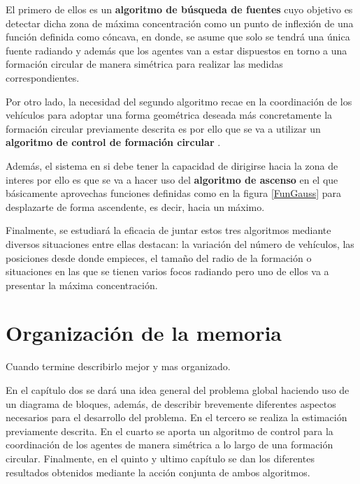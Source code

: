 El primero de ellos es un \textbf{algoritmo de búsqueda de fuentes} \cite{Estimacion_Gradiente} cuyo objetivo es detectar dicha zona de máxima concentración como un punto de inflexión de una función definida como cóncava, en donde, se asume que solo se tendrá una única fuente radiando y además que los agentes van a estar dispuestos en torno a una formación circular de manera simétrica para realizar las medidas correspondientes. 

Por otro lado, la necesidad del segundo algoritmo recae en la coordinación de los vehículos para adoptar una forma geométrica deseada más concretamente la formación circular previamente descrita es por ello que se va a utilizar un \textbf{algoritmo de control de formación circular} \cite{Control_Formacion}.

Además, el sistema en si debe tener la capacidad de dirigirse hacia la zona de interes por ello es que se va a hacer uso del \textbf{algoritmo de ascenso} en el que básicamente aprovechas funciones definidas como en la figura \ref{FunGauss} para desplazarte de forma ascendente, es decir, hacia un máximo.

Finalmente, se estudiará la eficacia de juntar estos tres algoritmos mediante diversos situaciones entre ellas destacan: la variación del número de vehículos, las posiciones desde donde empieces, el tamaño del radio de la formación o situaciones en las que se tienen varios focos radiando pero uno de ellos va a presentar la máxima concentración.

\section{Organización de la memoria}

Cuando termine describirlo mejor y mas organizado.

En el capítulo dos se dará una idea general del problema global haciendo uso de un diagrama de bloques, además, de describir brevemente diferentes aspectos necesarios para el desarrollo del problema. En el tercero se realiza la estimación previamente descrita. En el cuarto se aporta un algoritmo de control para la coordinación de los agentes de manera simétrica a lo largo de una formación circular. Finalmente, en el quinto y ultimo capítulo se dan los diferentes resultados obtenidos mediante la acción conjunta de ambos algoritmos.